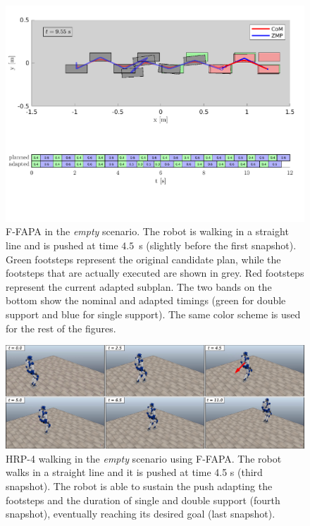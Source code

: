 \begin{figure}
    \includegraphics[trim={0 2.2cm 0 8.6cm},clip,width=\textwidth]{figures/empty-fixed-plot-completing-task.pdf}
    \caption{F-FAPA in the {\em empty} scenario. The robot is walking in a straight line and is pushed at time $4.5$~s (slightly before the first snapshot). Green footsteps represent the original candidate plan, while the footsteps that are actually executed are shown in grey. Red footsteps represent the current adapted subplan. The two bands on the bottom show the nominal and adapted timings (green for double support and blue for single support). The same color scheme is used for the rest of the figures.}
    \label{fig:FAPA:matlab_empty}
\end{figure}

\begin{figure}
    \centering
    \includegraphics[width=\textwidth]{figures/empty-push-fixed-snapshots.jpeg}
    \caption{HRP-4 walking in the \textit{empty} scenario using F-FAPA. The robot walks in a straight line and it is pushed at time 4.5 s (third snapshot). The robot is able to sustain the push adapting the footsteps and the duration of single and double support (fourth snapshot), eventually reaching its desired goal (last snapshot).}
    \label{fig:FAPA:sim1:snapshots}
\end{figure}

